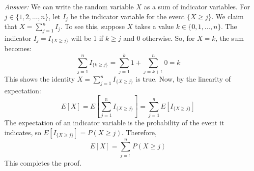 \documentclass{article}
\begin{document}
\begin{enumerate}
    \medskip
    \noindent \textit{Answer:}
    We can write the random variable $X$ as a sum of indicator variables. For $j \in \{1, 2, \dots, n\}$, let $I_j$ be the indicator variable for the event $\{X \ge j\}$.
    We claim that $X = \sum_{j=1}^{n} I_j$.
    To see this, suppose $X$ takes a value $k \in \{0, 1, \dots, n\}$.
    The indicator $I_j = I_{\{X \ge j\}}$ will be 1 if $k \ge j$ and 0 otherwise.
    So, for $X=k$, the sum becomes:
    \[
        \sum_{j=1}^{n} I_{\{k \ge j\}} = \sum_{j=1}^{k} 1 + \sum_{j=k+1}^{n} 0 = k
    \]
    This shows the identity $X = \sum_{j=1}^{n} I_{\{X \ge j\}}$ is true.
    Now, by the linearity of expectation:
    \[
        E[X] = E\left[\sum_{j=1}^{n} I_{\{X \ge j\}}\right] = \sum_{j=1}^{n} E[I_{\{X \ge j\}}]
    \]
    The expectation of an indicator variable is the probability of the event it indicates, so $E[I_{\{X \ge j\}}] = P(X \ge j)$.
    Therefore,
    \[
        E[X] = \sum_{j=1}^{n} P(X \ge j)
    \]
    This completes the proof.

\end{enumerate}
\end{document}
